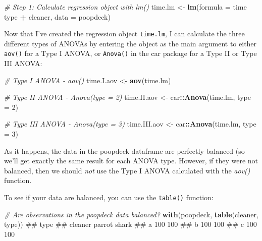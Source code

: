 \documentclass[]{book}
\newenvironment{Shaded}{\begin{snugshade}}{\end{snugshade}}
\newcommand{\KeywordTok}[1]{\textcolor[rgb]{0.13,0.29,0.53}{\textbf{#1}}}
\newcommand{\DataTypeTok}[1]{\textcolor[rgb]{0.13,0.29,0.53}{#1}}
\newcommand{\DecValTok}[1]{\textcolor[rgb]{0.00,0.00,0.81}{#1}}
\newcommand{\StringTok}[1]{\textcolor[rgb]{0.31,0.60,0.02}{#1}}
\newcommand{\CommentTok}[1]{\textcolor[rgb]{0.56,0.35,0.01}{\textit{#1}}}
\newcommand{\OperatorTok}[1]{\textcolor[rgb]{0.81,0.36,0.00}{\textbf{#1}}}
\newcommand{\NormalTok}[1]{#1}
\theoremstyle{definition}
\theoremstyle{definition}
\theoremstyle{remark}
\begin{document}
\begin{Shaded}
\begin{Highlighting}[]
\CommentTok{# Step 1: Calculate regression object with lm()}
\NormalTok{time.lm <-}\StringTok{ }\KeywordTok{lm}\NormalTok{(}\DataTypeTok{formula =}\NormalTok{ time }\OperatorTok{~}\StringTok{ }\NormalTok{type }\OperatorTok{+}\StringTok{ }\NormalTok{cleaner,}
              \DataTypeTok{data =}\NormalTok{ poopdeck)}
\end{Highlighting}
\end{Shaded}

Now that I've created the regression object \texttt{time.lm}, I can
calculate the three different types of ANOVAs by entering the object as
the main argument to either \texttt{aov()} for a Type I ANOVA, or
\texttt{Anova()} in the car package for a Type II or Type III ANOVA:

\begin{Shaded}
\begin{Highlighting}[]
\CommentTok{# Type I ANOVA - aov()}
\NormalTok{time.I.aov <-}\StringTok{ }\KeywordTok{aov}\NormalTok{(time.lm)}

\CommentTok{# Type II ANOVA - Anova(type = 2)}
\NormalTok{time.II.aov <-}\StringTok{ }\NormalTok{car}\OperatorTok{::}\KeywordTok{Anova}\NormalTok{(time.lm, }\DataTypeTok{type =} \DecValTok{2}\NormalTok{)}

\CommentTok{# Type III ANOVA - Anova(type = 3)}
\NormalTok{time.III.aov <-}\StringTok{ }\NormalTok{car}\OperatorTok{::}\KeywordTok{Anova}\NormalTok{(time.lm, }\DataTypeTok{type =} \DecValTok{3}\NormalTok{)}
\end{Highlighting}
\end{Shaded}

As it happens, the data in the poopdeck dataframe are perfectly balanced
(so we'll get exactly the same result for each ANOVA type. However, if
they were not balanced, then we should \emph{not} use the Type I ANOVA
calculated with the \emph{aov()} function.

To see if your data are balanced, you can use the \texttt{table()}
function:

\begin{Shaded}
\begin{Highlighting}[]
\CommentTok{# Are observations in the poopdeck data balanced?}
\KeywordTok{with}\NormalTok{(poopdeck,}
     \KeywordTok{table}\NormalTok{(cleaner, type))}
\NormalTok{##        type}
\NormalTok{## cleaner parrot shark}
\NormalTok{##       a    100   100}
\NormalTok{##       b    100   100}
\NormalTok{##       c    100   100}
\end{Highlighting}
\end{Shaded}
\end{document}
